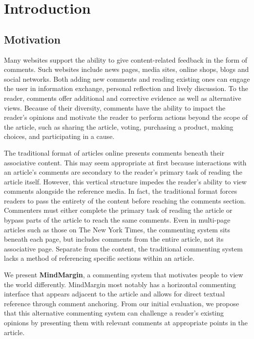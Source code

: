 \section{Introduction}

\subsection{Motivation}
Many websites support the ability to give content-related feedback in the form of comments. Such websites include news pages, media sites, online shops, blogs and social networks. Both adding new comments and reading existing ones can engage the user in information exchange, personal reflection and lively discussion. To the reader, comments offer additional and corrective evidence as well as alternative views. Because of their diversity, comments have the ability to impact the reader’s opinions and motivate the reader to perform actions beyond the scope of the article, such as sharing the article, voting, purchasing a product, making choices, and participating in a cause. 

The traditional format of articles online presents comments beneath their associative content. This may seem appropriate at first because interactions with an article’s comments are secondary to the reader’s primary task of reading the article itself. However, this vertical structure impedes the reader's ability to view comments alongside the reference media. In fact, the traditional format forces readers to pass the entirety of the content before reaching the comments section. Commenters must either complete the primary task of reading the article or bypass parts of the article to reach the same comments. Even in multi-page articles such as those on The New York Times, the commenting system sits beneath each page, but includes comments from the entire article, not its associative page. Separate from the content, the traditional commenting system lacks a method of referencing specific sections within an article.

We present \textbf{MindMargin}, a commenting system that motivates people to view the world differently. MindMargin most notably has a horizontal commenting interface that appears adjacent to the article and allows for direct textual reference through comment anchoring. From our initial evaluation, we propose that this alternative commenting system can challenge a reader’s existing opinions by presenting them with relevant comments at appropriate points in the article. 

